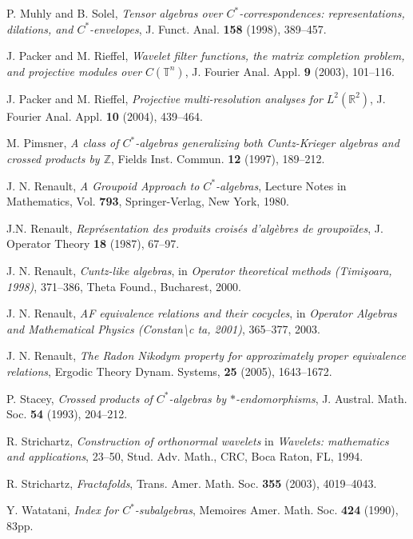 \documentclass{amsproc}
\theoremstyle{plain}
\theoremstyle{definition}
\theoremstyle{definition}
\theoremstyle{remark}
\theoremstyle{plain}
\begin{document}
\begin{thebibliography}{10}
P. Muhly and B. Solel, \emph{Tensor algebras over
$C^{*}$-correspondences:
representations, dilations, and $C^{*}$-envelopes}, J. Funct. Anal.
\textbf{158} (1998), 389--457.

J. Packer and M. Rieffel, \emph{Wavelet filter functions,
the matrix completion problem, and projective modules over} $C(\mathbb{T}^{n})$,
J. Fourier Anal. Appl. \textbf{9} (2003), 101--116.

J. Packer and M. Rieffel, \emph{Projective multi-resolution
analyses for} $L^{2}(\mathbb{R}^{2})$, J. Fourier Anal. Appl. \textbf{10}
(2004), 439--464.

M. Pimsner, \emph{A class of $C^{*}$-algebras generalizing
both Cuntz-Krieger algebras and crossed products by $\mathbb{Z}$},
Fields Inst. Commun. \textbf{12} (1997), 189--212.

J. N. Renault, \emph{A Groupoid Approach to $C^{*}$-algebras},
Lecture Notes in Mathematics, Vol. \textbf{793}, Springer-Verlag,
New York, 1980.

J.N. Renault, \emph{Repr\'esentation des produits
crois\'es d'alg\`ebres de groupo\"ides}, J. Operator Theory \textbf{18}
(1987), 67--97.

J. N. Renault, \emph{Cuntz-like algebras}, in \emph{Operator
theoretical methods (Timi\c soara, 1998)}, 371--386, Theta Found.,
Bucharest, 2000.

J. N. Renault, \emph{AF equivalence relations and their
cocycles}, in \emph{Operator Algebras and Mathematical Physics
(Constan\textbackslash{}c
ta, 2001)}, 365--377, 2003.

J. N. Renault, \emph{The Radon Nikodym property for
approximately proper equivalence relations}, Ergodic Theory Dynam.
Systems, \textbf{25} (2005), 1643--1672.

P. Stacey, \emph{Crossed products of $C^{*}$-algebras
by $*$-endomorphisms}, J. Austral. Math. Soc. \textbf{54} (1993),
204--212.

R. Strichartz, \emph{Construction of orthonormal wavelets}
in \emph{Wavelets: mathematics and applications}, 23--50, Stud. Adv.
Math., CRC, Boca Raton, FL, 1994.

R. Strichartz, \emph{Fractafolds}, Trans. Amer. Math.
Soc. \textbf{355} (2003), 4019--4043.

Y. Watatani, \emph{Index for $C^{*}$-subalgebras},
Memoires Amer. Math. Soc. \textbf{424} (1990), 83pp.
\end{thebibliography}
\end{document}
